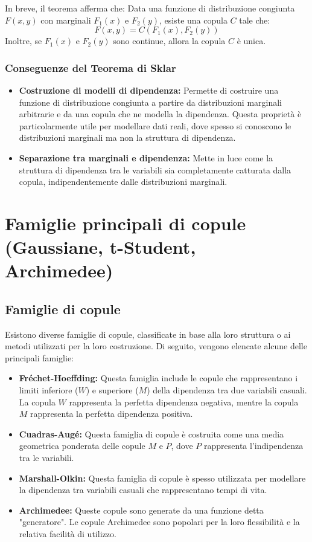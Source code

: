 \documentclass[%
	corpo=11pt,
    twoside,
    stile=classica,
    oldstyle,
    tipotesi=custom,
    greek,
    evenboxes,
]{toptesi}
\begin{document}
In breve, il teorema afferma che:  
Data una funzione di distribuzione congiunta \( F(x,y) \) con marginali \( F_1(x) \) e \( F_2(y) \), esiste una copula \( C \) tale che:
\[
F(x,y) = C(F_1(x), F_2(y))
\]
Inoltre, se \( F_1(x) \) e \( F_2(y) \) sono continue, allora la copula \( C \) è unica.

\subsubsection{Conseguenze del Teorema di Sklar}
\begin{itemize}
	\item \textbf{Costruzione di modelli di dipendenza:}  
	Permette di costruire una funzione di distribuzione congiunta a partire da distribuzioni marginali arbitrarie e da una copula che ne modella la dipendenza. Questa proprietà è particolarmente utile per modellare dati reali, dove spesso si conoscono le distribuzioni marginali ma non la struttura di dipendenza.
	
	\item \textbf{Separazione tra marginali e dipendenza:}  
	Mette in luce come la struttura di dipendenza tra le variabili sia completamente catturata dalla copula, indipendentemente dalle distribuzioni marginali.
\end{itemize}


\section{Famiglie principali di copule (Gaussiane, t-Student, Archimedee) }

\subsection{Famiglie di copule}
Esistono diverse famiglie di copule, classificate in base alla loro struttura o ai metodi utilizzati per la loro costruzione. Di seguito, vengono elencate alcune delle principali famiglie:

\begin{itemize}
	\item \textbf{Fréchet-Hoeffding:} Questa famiglia include le copule che rappresentano i limiti inferiore (\(W\)) e superiore (\(M\)) della dipendenza tra due variabili casuali. La copula \(W\) rappresenta la perfetta dipendenza negativa, mentre la copula \(M\) rappresenta la perfetta dipendenza positiva.
	
	\item \textbf{Cuadras-Augé:} Questa famiglia di copule è costruita come una media geometrica ponderata delle copule \(M\) e \(P\), dove \(P\) rappresenta l’indipendenza tra le variabili.
	
	\item \textbf{Marshall-Olkin:} Questa famiglia di copule è spesso utilizzata per modellare la dipendenza tra variabili casuali che rappresentano tempi di vita.
	
	\item \textbf{Archimedee:} Queste copule sono generate da una funzione detta "generatore". Le copule Archimedee sono popolari per la loro flessibilità e la relativa facilità di utilizzo.
\end{itemize}
\end{document}
